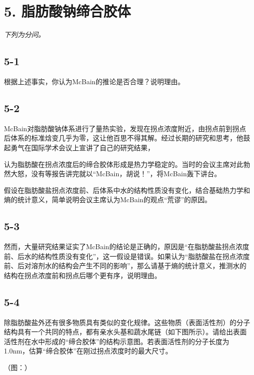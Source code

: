 \section*{5. 脂肪酸钠缔合胶体}
\textit{下列为分问。}

\subsection*{5-1}
根据上述事实，你认为McBain的推论是否合理？说明理由。

\subsection*{5-2}
McBain对脂肪酸钠体系进⾏了量热实验，发现在拐点浓度附近，由拐点前到拐点后体系的标准焓变⼏乎为零，这让他百思不得其解。经过⻓期的研究和思考，他⿎起勇⽓在国际学术会议上宣讲了⾃⼰的研究结果，

认为脂肪酸在拐点浓度后的缔合胶体形成是热⼒学稳定的。当时的会议主席对此勃然⼤怒，没有等报告讲完就以“McBain，胡说！”，将McBain轰下讲台。

假设在脂肪酸盐拐点浓度前、后体系中⽔的结构性质没有变化，结合基础热⼒学和熵的统计意义，简单说明会议主席认为McBain的观点“荒谬”的原因。

\subsection*{5-3}
然⽽，⼤量研究结果证实了McBain的结论是正确的，原因是“在脂肪酸盐拐点浓度前、后⽔的结构性质没有变化”，这⼀假设是错误。如果认为“脂肪酸盐在拐点浓度前、后对溶剂⽔的结构会产⽣不同的影响”，那么请基于熵的统计意义，推测⽔的结构在拐点浓度前和拐点后哪个更有序，说明理由。

\subsection*{5-4}
除脂肪酸盐外还有很多物质具有类似的变化规律。这些物质（表⾯活性剂）的分⼦结构具有⼀个共同的特点，都有亲⽔头基和蔬⽔尾链（如下图所⽰）。请给出表⾯活性剂在⽔中形成的“缔合胶体”的结构⽰意图。若表⾯活性剂的分⼦⻓度为1.0nm，估算“缔合胶体”在刚过拐点浓度时的最⼤尺⼨。

（图：）
